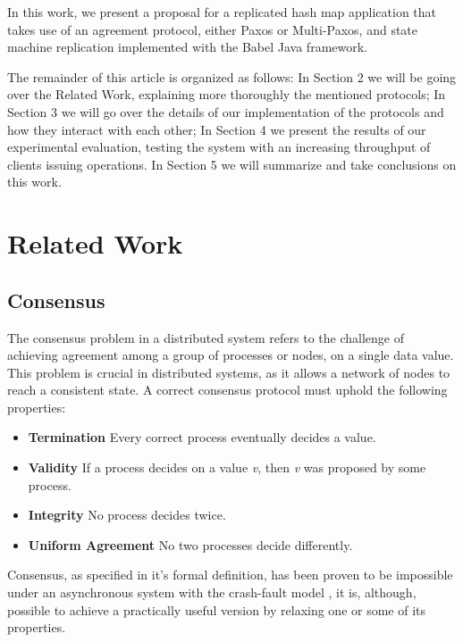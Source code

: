 \documentclass[sigconf]{acmart}
\begin{document}
In this work, we present a proposal for a replicated hash map application that takes use of an agreement protocol, either Paxos or Multi-Paxos, and state machine replication implemented with the Babel \cite{fouto2022babel} Java framework.

The remainder of this article is organized as follows: In Section 2 we will be going over the Related Work, explaining more thoroughly the mentioned protocols; In Section 3 we will go over the details of our implementation of the protocols and how they interact with each other; In Section 4 we present the results of our experimental evaluation, testing the system with an increasing throughput of clients issuing operations. In Section 5 we will summarize and take conclusions on this work.


\section{Related Work}

\subsection{Consensus}

The consensus problem in a distributed system refers to the challenge of achieving agreement among a group of processes or nodes, on a single data value. This problem is crucial in distributed systems, as it allows a network of nodes to reach a consistent state. A correct consensus protocol must uphold the following properties:

\begin{itemize}
    \item \textbf{Termination} Every correct process eventually decides a value.
    \item \textbf{Validity} If a process decides on a value \textit{v}, then \textit{v} was proposed by some process.
    \item \textbf{Integrity} No process decides twice.
    \item \textbf{Uniform Agreement} No two processes decide differently. 
\end{itemize}

Consensus, as specified in it's formal definition, has been proven to be impossible under an asynchronous system with the crash-fault model \cite{fischer1985impossibility}, it is, although, possible to achieve a practically useful version by relaxing one or some of its properties.
\end{document}

